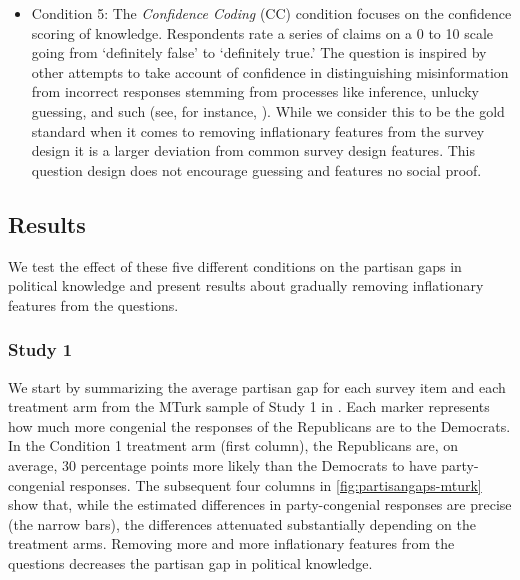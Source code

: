 \documentclass[12pt, letterpaper]{article}
\begin{document}
\begin{itemize}
	\item Condition 5: The \textit{Confidence Coding} (CC) condition focuses on the confidence scoring of knowledge. Respondents rate a series of claims on a 0 to 10 scale going from `definitely false' to `definitely true.' The question is inspired by other attempts to take account of confidence in distinguishing misinformation from incorrect responses stemming from processes like inference, unlucky guessing, and such (see, for instance, \citet{pasek2015}). While we consider this to be the gold standard when it comes to removing inflationary features from the survey design it is a larger deviation from common survey design features. This question design does not encourage guessing and features no social proof.

\end{itemize}

\subsection*{Results}
We test the effect of these five different conditions on the partisan gaps in political knowledge and present results about gradually removing inflationary features from the questions.


\subsubsection*{Study 1}
We start by summarizing the average partisan gap for each survey item and each treatment arm from the MTurk sample of Study 1 in . Each marker represents how much more congenial the responses of the Republicans are to the Democrats. In the Condition 1 treatment arm (first column), the Republicans are, on average, 30 percentage points more likely than the Democrats to have party-congenial responses. The subsequent four columns in \cref{fig:partisangaps-mturk} show that, while the estimated differences in party-congenial responses are precise (the narrow bars), the differences attenuated substantially depending on the treatment arms. Removing more and more inflationary features from the questions decreases the partisan gap in political knowledge.

%
\end{document}
